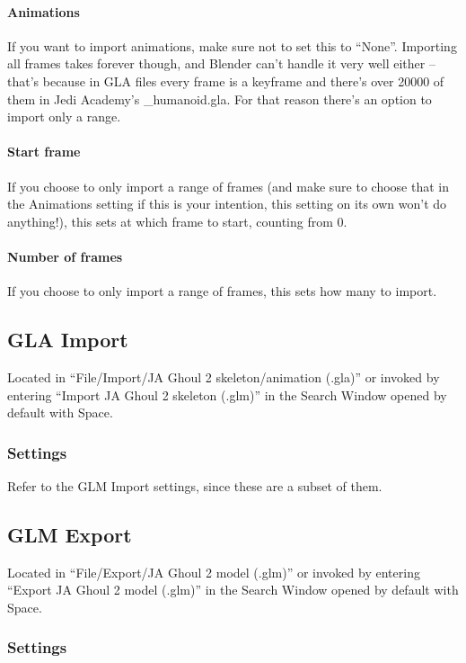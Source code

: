 \documentclass[a4paper,10pt]{article}
\begin{document}
 \paragraph*{Animations}
 If you want to import animations, make sure not to set this to ``None''. Importing all frames takes forever
 though, and Blender can't handle it very well either -- that's because in GLA files every frame is a keyframe
 and there's over 20000 of them in Jedi Academy's \_humanoid.gla. For that reason there's an option to import
 only a range.
 
 \paragraph*{Start frame}
 If you choose to only import a range of frames (and make sure to choose that in the Animations setting if
 this is your intention, this setting on its own won't do anything!), this sets at which frame to start, 
 counting from 0.
 
 \paragraph*{Number of frames}
 If you choose to only import a range of frames, this sets how many to import.
 
 
 \subsection{GLA Import}
 
 Located in ``File/Import/JA Ghoul 2 skeleton/animation (.gla)'' or invoked by entering ``Import JA Ghoul 2
 skeleton (.glm)'' in the Search Window opened by default with Space.
 
 \subsubsection*{Settings}
 
 Refer to the GLM Import settings, since these are a subset of them.
 
 
 \subsection{GLM Export}
 
 Located in ``File/Export/JA Ghoul 2 model (.glm)'' or invoked by entering ``Export JA Ghoul 2 model (.glm)''
 in the Search Window opened by default with Space.
 
 \subsubsection*{Settings}
 
\end{document}
